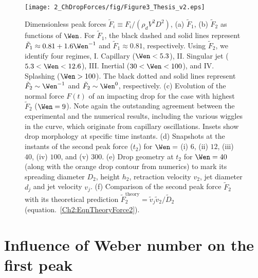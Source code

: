 \begin{figure}
	\centering
	\texttt{[image: 2\_ChDropForces/fig/Figure3\_Thesis\_v2.eps]}
	\caption{Dimensionless peak forces $\tilde{F}_i \equiv F_i/\left(\rho_d V^2D^2\right)$, (a) $\tilde{F}_1$, (b) $\tilde{F}_2$ as functions of $\Wen$. For $\tilde{F}_1$, the black dashed and solid lines represent $\tilde{F}_1 \approx 0.81 + 1.6\Wen^{-1}$ and $\tilde{F}_1 \approx 0.81$, respectively. Using $\tilde{F}_2$, we identify four regimes, I. Capillary ($\Wen < 5.3$), II. Singular jet ($5.3 < \Wen < 12.6$), III. Inertial ($30 < \Wen < 100$), and IV. Splashing ($\Wen > 100$). The black dotted and solid lines represent $\tilde{F}_2 \sim \Wen^{-1}$ and $\tilde{F}_2 \sim \Wen^0$, respectively.  (c) Evolution of the normal force $F(t)$ of an impacting drop for the case with highest $\tilde{F}_2$ ($\Wen = 9$). Note again the outstanding agreement between the experimental and the numerical results, including the various wiggles in the curve, which originate from capillary oscillations. Insets show drop morphology at specific time instants. (d) Snapshots at the instants of the second peak force ($t_2$) for $\Wen =$ (i) $6$, (ii) $12$, (iii) $40$, (iv) $100$, and (v) $300$. (e) Drop geometry at $t_2$ for $\Wen = 40$ (along with the orange drop contour from numerics) to mark its spreading diameter $D_2$, height $h_2$, retraction velocity $v_2$, jet diameter $d_j$ and jet velocity $v_j$. (f) Comparison of the second peak force $\tilde{F}_2$ with its theoretical prediction $\tilde{F}_2^{\text{theory}} = \tilde{v}_j\tilde{v}_2/\tilde D_2$ (equation.~\eqref{Ch2:EqnTheoryForce2}).}
	\label{Ch2:FigMain}
\end{figure}

\section{Influence of Weber number on the first peak}\label{Ch2:SecFirstPeak}

